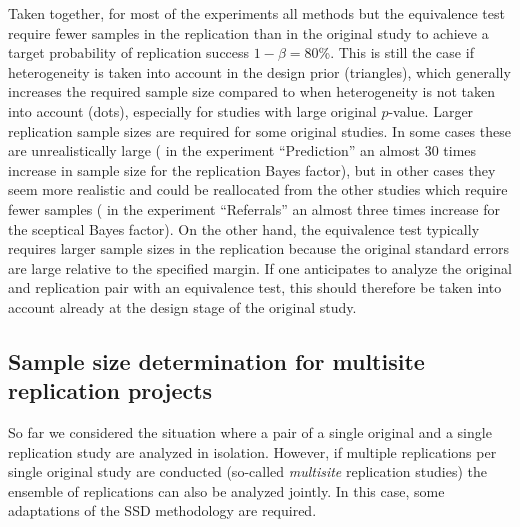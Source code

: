 Taken together, for most of the experiments all methods but the equivalence test
require fewer samples in the replication than in the original study to achieve a
target probability of replication success
$1 - \beta = 80$\%. This is still the case if
heterogeneity is taken into account in the design prior (triangles), which
generally increases the required sample size compared to when heterogeneity is
not taken into account (dots), especially for studies with large original
$p$-value. Larger replication sample sizes are required for some original
studies. In some cases these are unrealistically large (\eg{} in the experiment
``Prediction'' an almost 30 times increase in sample size for the replication
Bayes factor), but in other cases they seem more realistic and could be
reallocated from the other studies which require fewer samples (\eg{} in the
experiment ``Referrals'' an almost three times increase for the sceptical Bayes
factor). On the other hand, the equivalence test typically requires larger
sample sizes in the replication because the original standard errors are large
relative to the specified margin. If one anticipates to analyze the original and
replication pair with an equivalence test, this should therefore be taken into
account already at the design stage of the original study.

\subsection{Sample size determination for multisite replication projects}
So far we considered the situation where a pair of a single original and a
single replication study are analyzed in isolation. However, if multiple
replications per single original study are conducted (so-called \emph{multisite}
replication studies) the ensemble of replications can also be analyzed jointly.
In this case, some adaptations of the SSD methodology are required.

